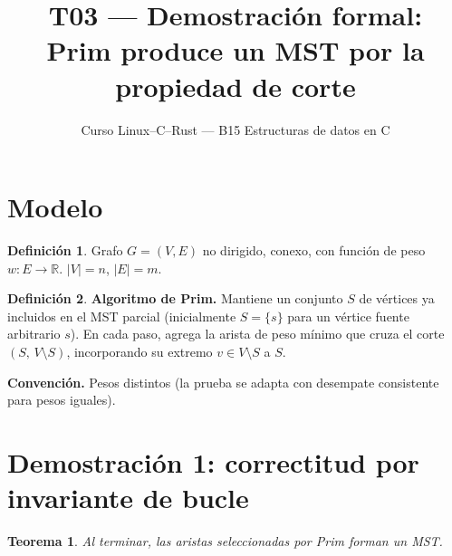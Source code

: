 \documentclass[11pt, letterpaper]{article}
\title{%
  T03 --- Demostración formal:\\[4pt]
  Prim produce un MST por la propiedad de corte
}
\author{Curso Linux--C--Rust --- B15 Estructuras de datos en C}
\date{}
\theoremstyle{definition}
\newtheorem{definition}{Definición}[section]
\theoremstyle{plain}
\newtheorem{theorem}{Teorema}[section]
\theoremstyle{remark}
\begin{document}
\maketitle
\tableofcontents

\section{Modelo}

\begin{definition}
Grafo $G = (V, E)$ no dirigido, conexo, con función de peso
$w: E \to \mathbb{R}$. $|V| = n$, $|E| = m$.
\end{definition}

\begin{definition}
\textbf{Algoritmo de Prim.} Mantiene un conjunto $S$ de vértices ya
incluidos en el MST parcial (inicialmente $S = \{s\}$ para un
vértice fuente arbitrario $s$). En cada paso, agrega la arista de
peso mínimo que cruza el corte $(S,\, V \setminus S)$, incorporando
su extremo $v \in V \setminus S$ a $S$.
\end{definition}

\textbf{Convención.} Pesos distintos (la prueba se adapta con
desempate consistente para pesos iguales).

\section{Demostración 1: correctitud por invariante de bucle}

\begin{theorem}\label{thm:correctness}
Al terminar, las aristas seleccionadas por Prim forman un MST.
\end{theorem}
\end{document}
